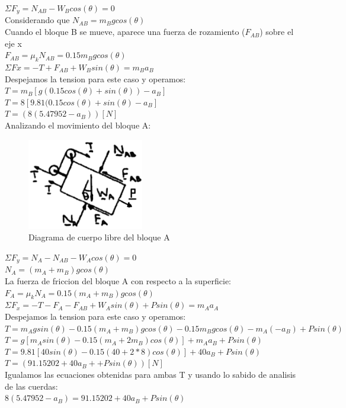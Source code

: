 \documentclass[a4paper,11pt]{scrartcl}
\begin{document}
\begin{center}
$\Sigma F_y = N_{AB} - W_B cos(\theta) = 0$\\
\hfill \break
Considerando que $N_{AB} = m_B g cos(\theta)$\\
\hfill \break
Cuando el bloque B se mueve, aparece una fuerza de rozamiento ($F_{AB}$) sobre el eje x\\
\hfill \break
$F_{AB} = \mu_k N_{AB} = 0.15 m_B g cos(\theta)$\\
\hfill \break
$\Sigma F x = - T + F_{AB} + W_B sin(\theta) = m_B a_B$\\
\hfill \break
Despejamos la tension para este caso y operamos:\\
\hfill \break
$T = m_B [ g (0.15 cos(\theta) + sin(\theta) ) - a_B ]$\\
\hfill \break
$T = 8[9.81(0.15 cos(\theta) + sin(\theta) - a_B ]$\\
\hfill \break
$T = (8(5.47952 - a_B)) [N]$\\
\hfill \break
Analizando el movimiento del bloque A:\\

\begin{figure}[H]
  \centering
  \includegraphics[height=4cm]{22_4}
  \caption{Diagrama de cuerpo libre del bloque A}
  \label{fig:22_4}
\end{figure}

$\Sigma F_y = N_A - N_{AB} - W_A cos(\theta) = 0$\\
\hfill \break
$N_A = ( m_A + m_B ) g cos(\theta)$\\
\hfill \break
La fuerza de friccion del bloque A con respecto a la superficie:\\
\hfill \break
$F_A = \mu_k N_A = 0.15( m_A + m_B ) g cos(\theta)$\\
\hfill \break
$\Sigma F_x =  - T - F_A - F_{AB} + W_A sin(\theta) + P sin(\theta) = m_A a_A$\\
\hfill \break
Despejamos la tension para este caso y operamos:\\
\hfill \break
$T = m_A g sin(\theta) - 0.15( m_A + m_B ) g cos(\theta) - 0.15 m_B g cos(\theta) - m_A ( - a_B ) + P sin(\theta)$\\
\hfill \break
$T = g [ m_A sin(\theta) - 0.15( m_A + 2 m_B ) cos(\theta) ] + m_A a_B + P sin(\theta)$\\
\hfill \break
$T = 9.81[40 sin(\theta) - 0.15(40 + 2 * 8) cos(\theta) ] + 40 a_B + P sin(\theta)$\\
\hfill \break
$T = (91.15202 + 40 a_B + + P sin(\theta)) [N]$\\
\hfill \break
Igualamos las ecuaciones obtenidas para ambas T y usando lo sabido de analisis de las cuerdas:\\
\hfill \break
$8(5.47952 - a_B ) = 91.15202 + 40 a_B + P sin(\theta)$\\


\end{center}
\end{document}
